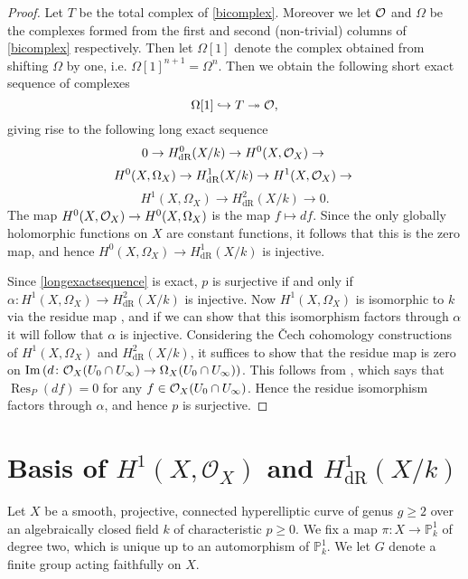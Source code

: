 \documentclass[draft, 11pt]{article} %
\theoremstyle{plain}
\theoremstyle{remark}
\newcommand{\cO}{{\cal O}}
\newcommand{\ra}{\rightarrow}
\newcommand{\cech}{\v{C}ech }
\newcommand{\hzero}{{H^0(X,\Omega_X)}}
\newcommand{\hone}{H^1(X,\mathcal{O}_X)}
\newcommand{\derhamhone}{H_{\text {dR}}^1(X/k)}
\DeclareMathOperator{\res}{Res}
\DeclareMathOperator{\Ima}{Im}
\begin{document}
\begin{proof}
Let $T$ be the total complex of \eqref{bicomplex}.
Moreover we let $\cO$ and $\Omega$ be the complexes formed from the first and second (non-trivial) columns of \eqref{bicomplex} respectively.
Then let $\Omega[1]$ denote the complex obtained from shifting $\Omega$ by one, i.e. $\Omega[1]^{n+1} = \Omega^n$.
Then we obtain the following short exact sequence of complexes 
\[
\Omega[1] \hookrightarrow T \twoheadrightarrow \cO,
\]
giving rise to the following long exact sequence
\begin{equation*}
0 \ra H^0_{\text {dR}}(X/k) \ra H^0(X,\cO_X) \ra \\
\end{equation*}
\begin{equation}\label{longexactsequence}
 H^0(X,\Omega_X) \ra \derhamhone \ra \hone \ra \\
\end{equation}
\begin{equation*}
 H^1(X,\Omega_X) \ra H^2_{\text {dR}}(X/k) \ra 0.
\end{equation*}
The map $H^0(X,\cO_X) \ra \hzero$ is the map $f \mapsto df$.
Since the only globally holomorphic functions on $X$ are constant functions, it follows that this is the zero map, and hence $\hzero \ra \derhamhone$ is injective.

Since \eqref{longexactsequence} is exact, $p$ is surjective if and only if $\alpha \colon H^1(X,\Omega_X) \ra H^2_{\text {dR}}(X/k)$ is injective.
Now $H^1(X,\Omega_X)$ is isomorphic to $k$ via the residue map \cite[Chap. III, Thm. 7.14.1]{hart}, and if we can show that this isomorphism factors through $\alpha$ it will follow that $\alpha$ is injective.
Considering the \cech cohomology constructions of $H^1(X,\Omega_X)$ and $H^2_{\text {dR}}(X/k)$, it suffices to show that the residue map is zero on $\Ima \left( d \colon \cO_X(U_0 \cap U_\infty) \ra \Omega_X(U_0 \cap U_\infty) \right)$.
This follows from \cite[Chap. III, Thm. 7.14.1 (b)]{hart}, which says that $\res_P(df)=0$ for any $f \in \cO_X(U_0 \cap U_\infty)$.
Hence the residue isomorphism factors through $\alpha$, and hence $p$ is surjective.
\end{proof}

\section{Basis of $\hone$ and $\derhamhone$}

Let $X$ be a smooth, projective, connected hyperelliptic curve of genus $g \geq 2$ over an algebraically closed field $k$ of characteristic $p \geq 0$.
We  fix a map $\pi \colon X \rightarrow \mathbb P_k^1$ of degree two, which is unique up to an automorphism of $\mathbb P_k^1$.
We let $G$ denote a finite group acting faithfully on $X$.
\end{document}
